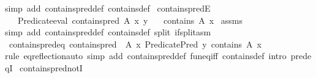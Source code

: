 \begin{isabellebody}
%
\isadelimproof
%
\endisadelimproof
%
\isatagproof
{}\isamarkupfalse%
{\isacharparenleft}{\kern0pt}simp\ add{\isacharcolon}{\kern0pt}\ contains{\isacharunderscore}{\kern0pt}pred{\isacharunderscore}{\kern0pt}def\ contains{\isacharunderscore}{\kern0pt}def{\isacharparenright}{\kern0pt}%
\endisatagproof
{\isafoldproof}%
%
\isadelimproof
\isanewline
%
\endisadelimproof
\isanewline
{}\isamarkupfalse%
\ contains{\isacharunderscore}{\kern0pt}predE{\isacharcolon}{\kern0pt}\ \isanewline
\ \ \ {\isachardoublequoteopen}Predicate{\isachardot}{\kern0pt}eval\ {\isacharparenleft}{\kern0pt}contains{\isacharunderscore}{\kern0pt}pred\ A\ x{\isacharparenright}{\kern0pt}\ y{\isachardoublequoteclose}\isanewline
\ \ \ {\isachardoublequoteopen}contains\ A\ x{\isachardoublequoteclose}\isanewline
%
\isadelimproof
%
\endisadelimproof
%
\isatagproof
{}\isamarkupfalse%
\ assms\ \isamarkupfalse%
{\isacharparenleft}{\kern0pt}simp\ add{\isacharcolon}{\kern0pt}\ contains{\isacharunderscore}{\kern0pt}pred{\isacharunderscore}{\kern0pt}def\ contains{\isacharunderscore}{\kern0pt}def\ split{\isacharcolon}{\kern0pt}\ if{\isacharunderscore}{\kern0pt}split{\isacharunderscore}{\kern0pt}asm{\isacharparenright}{\kern0pt}%
\endisatagproof
{\isafoldproof}%
%
\isadelimproof
\isanewline
%
\endisadelimproof
\isanewline
{}\isamarkupfalse%
\ contains{\isacharunderscore}{\kern0pt}pred{\isacharunderscore}{\kern0pt}eq{\isacharcolon}{\kern0pt}\ {\isachardoublequoteopen}contains{\isacharunderscore}{\kern0pt}pred\ {\isasymequiv}\ {\isasymlambda}A\ x{\isachardot}{\kern0pt}\ Predicate{\isachardot}{\kern0pt}Pred\ {\isacharparenleft}{\kern0pt}{\isasymlambda}y{\isachardot}{\kern0pt}\ contains\ A\ x{\isacharparenright}{\kern0pt}{\isachardoublequoteclose}\isanewline
%
\isadelimproof
%
\endisadelimproof
%
\isatagproof
{}\isamarkupfalse%
{\isacharparenleft}{\kern0pt}rule\ eq{\isacharunderscore}{\kern0pt}reflection{\isacharparenright}{\kern0pt}{\isacharparenleft}{\kern0pt}auto\ simp\ add{\isacharcolon}{\kern0pt}\ contains{\isacharunderscore}{\kern0pt}pred{\isacharunderscore}{\kern0pt}def\ fun{\isacharunderscore}{\kern0pt}eq{\isacharunderscore}{\kern0pt}iff\ contains{\isacharunderscore}{\kern0pt}def\ intro{\isacharcolon}{\kern0pt}\ pred{\isacharunderscore}{\kern0pt}eqI{\isacharparenright}{\kern0pt}%
\endisatagproof
{\isafoldproof}%
%
\isadelimproof
\isanewline
%
\endisadelimproof
\isanewline
{}\isamarkupfalse%
\ contains{\isacharunderscore}{\kern0pt}pred{\isacharunderscore}{\kern0pt}notI{\isacharcolon}{\kern0pt}\isanewline

\end{isabellebody}

